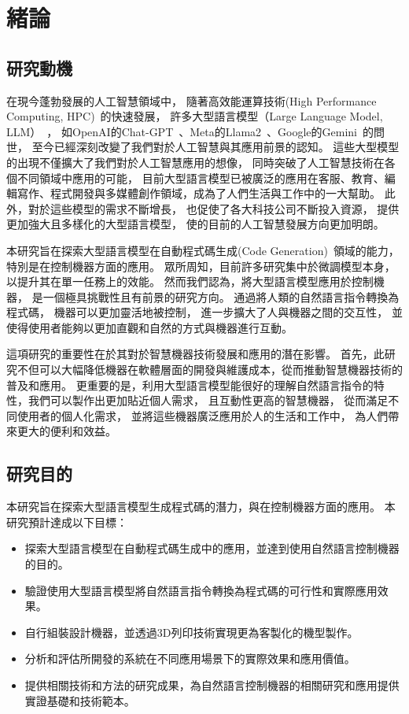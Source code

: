 \documentclass[class=NCU_thesis, crop=false]{standalone}
\begin{document}
\chapter{緒論}
\section{研究動機}

在現今蓬勃發展的人工智慧領域中，
隨著高效能運算技術(High Performance Computing, HPC)~\cite{reed2022reinventing}的快速發展，
許多大型語言模型（Large Language Model, LLM）~\cite{zhao2023survey}，
如OpenAI的Chat-GPT~\cite{Liu_2023}、Meta的Llama2~\cite{touvron2023llama}、Google的Gemini~\cite{geminiteam2024gemini}的問世，
至今已經深刻改變了我們對於人工智慧與其應用前景的認知。
這些大型模型的出現不僅擴大了我們對於人工智慧應用的想像，
同時突破了人工智慧技術在各個不同領域中應用的可能，
目前大型語言模型已被廣泛的應用在客服、教育、編輯寫作、程式開發與多媒體創作領域，成為了人們生活與工作中的一大幫助。
此外，對於這些模型的需求不斷增長，
也促使了各大科技公司不斷投入資源，
提供更加強大且多樣化的大型語言模型，
使的目前的人工智慧發展方向更加明朗。

本研究旨在探索大型語言模型在自動程式碼生成(Code Generation)~\cite{10196869}領域的能力，
特別是在控制機器方面的應用。
眾所周知，目前許多研究集中於微調模型本身，
以提升其在單一任務上的效能。
然而我們認為，將大型語言模型應用於控制機器，
是一個極具挑戰性且有前景的研究方向。
通過將人類的自然語言指令轉換為程式碼，
機器可以更加靈活地被控制，
進一步擴大了人與機器之間的交互性，
並使得使用者能夠以更加直觀和自然的方式與機器進行互動。

這項研究的重要性在於其對於智慧機器技術發展和應用的潛在影響。
首先，此研究不但可以大幅降低機器在軟體層面的開發與維護成本，從而推動智慧機器技術的普及和應用。
更重要的是，利用大型語言模型能很好的理解自然語言指令的特性，我們可以製作出更加貼近個人需求，
且互動性更高的智慧機器，
從而滿足不同使用者的個人化需求，
並將這些機器廣泛應用於人的生活和工作中，
為人們帶來更大的便利和效益。

\section{研究目的}

本研究旨在探索大型語言模型生成程式碼的潛力，與在控制機器方面的應用。
本研究預計達成以下目標：
\begin{itemize}

	\item 探索大型語言模型在自動程式碼生成中的應用，並達到使用自然語言控制機器的目的。

	\item 驗證使用大型語言模型將自然語言指令轉換為程式碼的可行性和實際應用效果。

	\item 自行組裝設計機器，並透過3D列印技術實現更為客製化的機型製作。

	\item 分析和評估所開發的系統在不同應用場景下的實際效果和應用價值。

	\item 提供相關技術和方法的研究成果，為自然語言控制機器的相關研究和應用提供實證基礎和技術範本。
\end{itemize}
\end{document}
